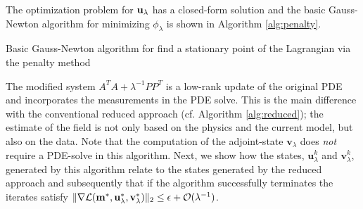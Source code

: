 \documentclass{iopart}
\begin{document}
The optimization problem for $\mathbf{u}_{\lambda}$ has a closed-form solution and 
the basic Gauss-Newton algorithm for minimizing $\phi_{\lambda}$ is shown in Algorithm \ref{alg:penalty}. 
%
\begin{algorithm}
\caption{Basic Gauss-Newton algorithm for find a stationary point of the Lagrangian via the penalty method}
\label{alg:penalty}
\begin{algorithmic}


\ENDWHILE
\end{algorithmic}
\end{algorithm}
%
The modified system $A^TA + \lambda^{-1}PP^T$ is a low-rank update of the original PDE and
incorporates the measurements in the PDE solve. This is the main difference with the conventional reduced approach (cf. Algorithm \ref{alg:reduced}); 
the estimate of the field is not only based on the physics and the current model, but also on the data.
Note that the computation of the adjoint-state $\mathbf{v}_{\lambda}$ does \emph{not} require a PDE-solve
in this algorithm.
Next, we show how the states, $\mathbf{u}^k_{\lambda}$ and $\mathbf{v}^k_{\lambda}$, generated by this algorithm  
relate to the states generated by the reduced approach and subsequently that if the algorithm successfully terminates
the iterates satisfy $\|\nabla\mathcal{L}(\mathbf{m}^*, \mathbf{u}^*_{\lambda}, \mathbf{v}^*_{\lambda})\|_2 \leq \epsilon + \mathcal{O}(\lambda^{-1})$.
\end{document}

